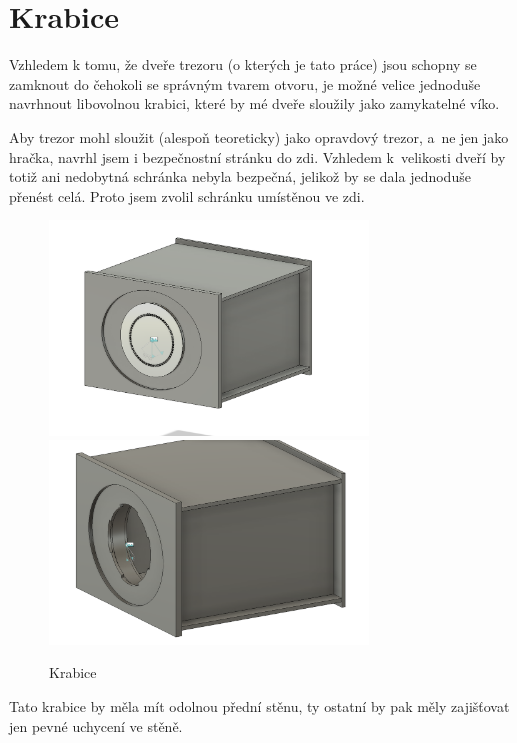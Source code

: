 \section{Krabice} %
Vzhledem k tomu, že dveře trezoru (o kterých je tato práce) jsou schopny se zamknout do čehokoli se správným tvarem otvoru, je možné velice jednoduše navrhnout libovolnou krabici, které by mé 
dveře sloužily jako zamykatelné víko. 

Aby trezor mohl sloužit (alespoň teoreticky) jako opravdový trezor, a~ne jen jako hračka, navrhl jsem i bezpečnostní stránku do zdi. Vzhledem k~velikosti dveří by totiž ani nedobytná schránka 
nebyla bezpečná, jelikož by se dala jednoduše přenést celá. Proto jsem zvolil schránku umístěnou ve zdi. 

\begin{figure}[htbp]
    \centering
    \includegraphics[width=240pt]{kapitoly/obrazky/E4/bedna/bedna.png}
    \includegraphics[width=240pt]{kapitoly/obrazky/E4/bedna/jen-bedna.png}
    \caption{Krabice}
    \label{fig:E4-bedna}
\end{figure}

Tato krabice by měla mít odolnou přední stěnu, ty ostatní by pak měly zajišťovat jen pevné uchycení ve stěně. %